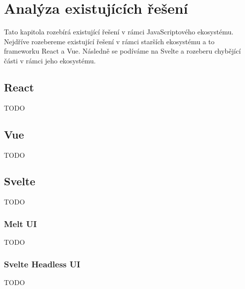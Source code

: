 \chapter{Analýza existujících řešení}

Tato kapitola rozebírá existující řešení v rámci JavaScriptového ekosystému.
Nejdříve rozebereme existující řešení v rámci starších ekosystému a to frameworku React a Vue.
Následně se podíváme na Svelte a rozeberu chybějící části v rámci jeho ekosystému.

\section{React}

TODO

\section{Vue}

TODO

\section{Svelte}

TODO

\subsection{Melt UI}

TODO

\subsection{Svelte Headless UI}

TODO
